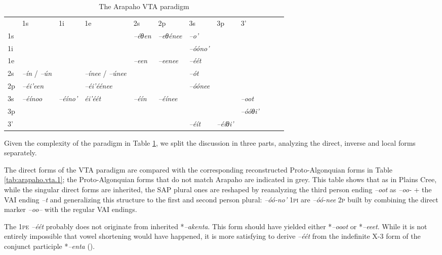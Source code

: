 \documentclass[twoside,a4paper,11pt]{article}
\newcommand{\ipa}[1]{{\phon\textit{#1}}}
\newcommand{\grise}[1]{\cellcolor{lightgray}\textbf{#1}}
\newcommand{\Σ}{\greek{Σ}}
\begin{document}
\begin{table}[H]
\caption{The Arapaho VTA paradigm}
\centering \label{tab:arapaho.vta}
\begin{tabular}{llllllllllll}
\toprule
 & 	1s & 	1i & 	1e & 	2s & 	2p & 	3s & 	3p & 	3' & 	\\
1s & \grise{} & 	\grise{} & 	\grise{} & 	\ipa{--éθen} & 	\ipa{--eθénee} & 	\ipa{--o'} & 	 & 	 & 	\\
1i & 	\grise{} & 	\grise{} & 	\grise{} & 	\grise{} & 	\grise{} & 	\ipa{--óóno'} & 	 & 	 & 	\\
1e & 	\grise{} & 	\grise{} & 	\grise{} & 	\ipa{--een} & 	\ipa{--eenee} & 	\ipa{--éét} & 	 & 	 & 	\\
2s & 	\ipa{--ín} / \ipa{--ún}& 	\grise{} & \ipa{--ínee} /	\ipa{--únee} & 	\grise{} & 	\grise{} & 	\ipa{--ót} & 	 & 	 & 	\\
2p & 	\ipa{--éi'een} & 	\grise{} & 	\ipa{--éi'éénee} & 	\grise{} & 	\grise{} & 	\ipa{--óónee} & 	 & 	 & 	\\
3s & 	\ipa{--éínoo} & 	\ipa{--éíno'} & 	\ipa{éi'éét} & 	\ipa{--éín} & 	\ipa{--éínee} & 	\grise{} & 	\grise{} & 	\ipa{--oot} & 	\\
3p & 	 & 	 & 	 & 	 & 	 & 	\grise{} & 	\grise{} & 	\ipa{--óóθi'} & 	\\
3' & 	 & 	 & 	 & 	 & 	 & 	\ipa{--éít} & 	\ipa{--éíθi'} &   & 	\\
\bottomrule
\end{tabular}
\end{table}

Given the complexity of the paradigm in 	Table \ref{tab:arapaho.vta}, we split the discussion  in three parts, analyzing the direct, inverse and local forms separately.

The direct forms of the VTA paradigm are compared with the corresponding reconstructed Proto-Algonquian forms in Table \ref{tab:arapaho.vta.1}; the Proto-Algonquian forms that do not match Arapaho are indicated in grey. This table shows that as in Plains Cree, while the singular direct forms are inherited, the SAP plural ones are reshaped by reanalyzing the third person ending \ipa{--oot} as \ipa{--oo-} + the VAI ending \ipa{--t} and generalizing this structure to the first and second person plural: \ipa{--óó-no'} \textsc{1pi} are \ipa{--óó-nee} \textsc{2p} built by combining the direct marker \ipa{--oo--} with the regular VAI endings.

The \textsc{1pe} \ipa{--éét} probably does not originate from inherited  *\ipa{--akenta}. This form should have yielded  either *\ipa{--ooot} or *\ipa{--eeet}. While it is not entirely impossible that vowel shortening would have happened, it is more satisfying to derive  \ipa{--éét}  from the indefinite X-3 form of the conjunct participle  *\ipa{--enta} (\citealt{goddard98morphology.arapaho}).
\end{document}
